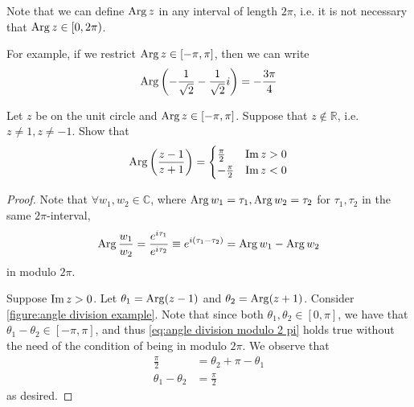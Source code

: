 \documentclass[notoc,notitlepage]{tufte-book}
\begin{document}
\begin{ex}
	Note that we can define $\operatorname{Arg} z$ in any interval of length $2 \pi$, i.e. it is not necessary that $\operatorname{Arg} z \in [0, 2\pi)$.

	For example, if we restrict $\operatorname{Arg} z \in [-\pi, \pi]$, then we can write
	\begin{equation*}
		\operatorname{Arg} \left(-\frac{1}{\sqrt{2}} - \frac{1}{\sqrt{2}} i \right) = - \frac{3\pi}{4}
	\end{equation*}

	Let $z$ be on the unit circle and $\operatorname{Arg} z \in [-\pi, \pi]$. Suppose that $z \notin \mathbb{R}$, i.e. $z \neq 1, z \neq -1$. Show that
	\begin{equation*}
		\operatorname{Arg} \left( \frac{z-1}{z+1} \right) = \begin{cases}
			\frac{\pi}{2} & \operatorname{Im}{z} > 0 \\
			-\frac{\pi}{2} & \operatorname{Im}{z} < 0
		\end{cases}
	\end{equation*}

	\begin{proof}
		Note that $\forall w_1, w_2 \in \mathbb{C}$, where $\operatorname{Arg} w_1 = \tau_1, \operatorname{Arg} w_2 = \tau_2$ for $\tau_1, \tau_2$ in the same $2\pi$-interval,
		\begin{equation}\label{eq:angle division modulo 2 pi}
			\operatorname{Arg} \frac{w_1}{w_2} = \frac{e^{i\tau_1}}{e^{i\tau_2}} \equiv e^{i (\tau_1 - \tau_2)} = \operatorname{Arg} w_1 - \operatorname{Arg} w_2
		\end{equation}
		in modulo $2\pi$.

		Suppose $\operatorname{Im}{z} > 0$. Let $\theta_1 = \operatorname{Arg} (z - 1)$ and $\theta_2 = \operatorname{Arg} (z + 1)$. Consider \cref{figure:angle division example}. Note that since both $\theta_1, \theta_2 \in [0, \pi]$, we have that $\theta_1 - \theta_2 \in [-\pi, \pi]$, and thus \cref{eq:angle division modulo 2 pi} holds true without the need of the condition of being in modulo $2 \pi$. We observe that
		\begin{align*}
			\frac{\pi}{2} &= \theta_2 + \pi - \theta_1 \\
			\theta_1 - \theta_2 &= \frac{\pi}{2}
		\end{align*}
		as desired.


\end{proof}
\end{ex}
\end{document}
